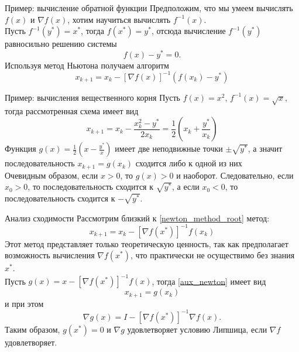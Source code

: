 \documentclass[10pt]{beamer}
\begin{document}
\begin{frame}{Пример: вычисление обратной функции}
Предположим, что мы умеем вычислять $f(x)$ и $\nabla f(x)$, хотим научиться вычислять $f^{-1}(x)$.\\
\vspace{1em}
\pause
Пусть $f^{-1}(y^*)=x^*$, тогда $f(x^*)=y^*$, отсюда вычисление $f^{-1}(y^*)$ равносильно решению системы
$$
f(x)-y^*=0.
$$
\pause
Используя метод Ньютона получаем алгоритм
$$
x_{k+1}=x_k-[\nabla f(x)]^{-1}(f(x_k)-y^*)
$$
\end{frame}

\begin{frame}{Пример: вычисления вещественного корня}
Пусть $f(x)=x^2$, $f^{-1}(x)=\sqrt{x}$, тогда рассмотренная схема имеет вид
$$
x_{k+1}=x_k-\frac{x_k^2-y^*}{2x_k}=\frac{1}{2}\left(x_k+\frac{y^*}{x_k}\right)
$$
\pause
Функция $g(x)=\frac{1}{2}\left(x-\frac{y^*}{x}\right)$ имеет две неподвижные точки $\pm\sqrt{y^*}$, а значит последовательность $x_{k+1}=g(x_k)$ сходится либо к одной из них\\
\vspace{1em}
Очевидным образом, если $x>0$, то $g(x)>0$ и наоборот. Следовательно, если $x_0>0$, то последовательность сходится к $\sqrt{y^*}$, а если $x_0<0$, то последовательность сходится к $-\sqrt{y^*}$.

\end{frame}

\begin{frame}{Анализ сходимости}
Рассмотрим близкий к \eqref{newton_method_root} метод: \begin{equation}\label{aux_newton}
x_{k+1}=x_k-[\nabla f(x^*)]^{-1}f(x_k)
\end{equation}
\pause
Этот метод представляет только теоретическую ценность, так как предполагает возможность вычисления $\nabla f(x^*)$, что практически не осуществимо без знания $x^*$.\\
\pause
\vspace{1em}
Пусть $g(x)=x-[\nabla f(x^*)]^{-1}f(x)$, тогда \eqref{aux_newton} имеет вид
$$
x_{k+1}=g(x_k)
$$
и при этом
$$
\nabla g(x)=I-[\nabla f(x^*)]^{-1}\nabla f(x).
$$
\pause
Таким образом, $g(x^*)=0$ и $\nabla g$ удовлетворяет условию Липшица, если $\nabla f$ удовлетворяет. 

\end{frame}
\end{document}
